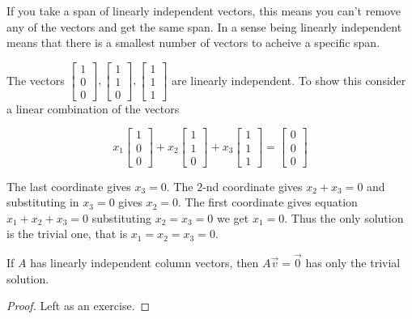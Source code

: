\begin{remark}
If you take a span of linearly independent vectors, this means you can't remove any of the vectors and get the same span. In a sense being linearly independent means that there is a smallest number of vectors to acheive a specific span. 
\end{remark}

\begin{example} The vectors 
$\begin{bmatrix}1 \\ 0 \\ 0 \end{bmatrix},\begin{bmatrix}1 \\ 1 \\ 0 \end{bmatrix},\begin{bmatrix}1 \\ 1 \\ 1 \end{bmatrix}$ 
are linearly independent. To show this consider a linear combination of the vectors

\[
x_1\begin{bmatrix}1 \\ 0 \\ 0 \end{bmatrix}+x_2\begin{bmatrix}1 \\ 1 \\ 0 \end{bmatrix}+x_3\begin{bmatrix}1 \\ 1 \\ 1 \end{bmatrix}
=\begin{bmatrix}0 \\ 0 \\ 0 \end{bmatrix}
\]

The last coordinate gives $x_3=0$. The $2$-nd coordinate gives $x_2+x_3=0$ and substituting in $x_3=0$ gives $x_2=0$. The first coordinate gives equation 
$x_1+x_2+x_3=0$ substituting $x_2=x_3=0$ we get $x_1=0$. Thus the only solution is the trivial one, that is $x_1=x_2=x_3=0$.
\end{example}

\begin{proposition}
If $A$ has linearly independent column vectors, then $A\vec{v}=\vec{0}$ has only the trivial solution.
\end{proposition}
\begin{proof}
Left as an exercise.
\end{proof}

